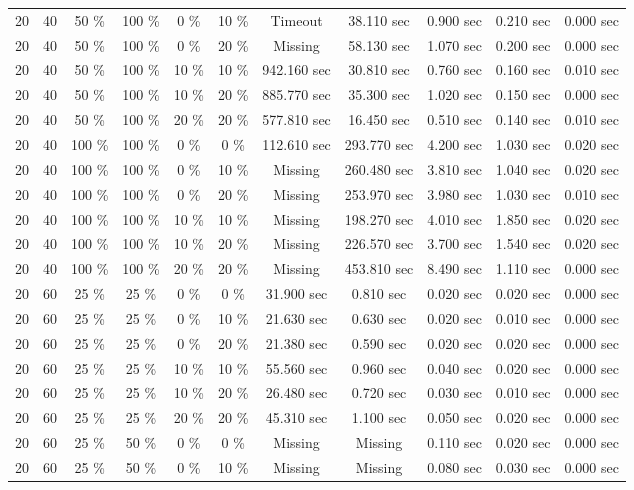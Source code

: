\documentclass{article}
\begin{document}
\begin{longtable}[]{@{}ccccccccccc@{}}
20 & 40 & 50 \% & 100 \% & 0 \% & 10 \% & Timeout & 38.110 sec & 0.900 sec & 0.210 sec & 0.000 sec \\
20 & 40 & 50 \% & 100 \% & 0 \% & 20 \% & Missing & 58.130 sec & 1.070 sec & 0.200 sec & 0.000 sec \\
20 & 40 & 50 \% & 100 \% & 10 \% & 10 \% & 942.160 sec & 30.810 sec & 0.760 sec & 0.160 sec & 0.010 sec \\
20 & 40 & 50 \% & 100 \% & 10 \% & 20 \% & 885.770 sec & 35.300 sec & 1.020 sec & 0.150 sec & 0.000 sec \\
20 & 40 & 50 \% & 100 \% & 20 \% & 20 \% & 577.810 sec & 16.450 sec & 0.510 sec & 0.140 sec & 0.010 sec \\
20 & 40 & 100 \% & 100 \% & 0 \% & 0 \% & 112.610 sec & 293.770 sec & 4.200 sec & 1.030 sec & 0.020 sec \\
20 & 40 & 100 \% & 100 \% & 0 \% & 10 \% & Missing & 260.480 sec & 3.810 sec & 1.040 sec & 0.020 sec \\
20 & 40 & 100 \% & 100 \% & 0 \% & 20 \% & Missing & 253.970 sec & 3.980 sec & 1.030 sec & 0.010 sec \\
20 & 40 & 100 \% & 100 \% & 10 \% & 10 \% & Missing & 198.270 sec & 4.010 sec & 1.850 sec & 0.020 sec \\
20 & 40 & 100 \% & 100 \% & 10 \% & 20 \% & Missing & 226.570 sec & 3.700 sec & 1.540 sec & 0.020 sec \\
20 & 40 & 100 \% & 100 \% & 20 \% & 20 \% & Missing & 453.810 sec & 8.490 sec & 1.110 sec & 0.000 sec \\
20 & 60 & 25 \% & 25 \% & 0 \% & 0 \% & 31.900 sec & 0.810 sec & 0.020 sec & 0.020 sec & 0.000 sec \\
20 & 60 & 25 \% & 25 \% & 0 \% & 10 \% & 21.630 sec & 0.630 sec & 0.020 sec & 0.010 sec & 0.000 sec \\
20 & 60 & 25 \% & 25 \% & 0 \% & 20 \% & 21.380 sec & 0.590 sec & 0.020 sec & 0.020 sec & 0.000 sec \\
20 & 60 & 25 \% & 25 \% & 10 \% & 10 \% & 55.560 sec & 0.960 sec & 0.040 sec & 0.020 sec & 0.000 sec \\
20 & 60 & 25 \% & 25 \% & 10 \% & 20 \% & 26.480 sec & 0.720 sec & 0.030 sec & 0.010 sec & 0.000 sec \\
20 & 60 & 25 \% & 25 \% & 20 \% & 20 \% & 45.310 sec & 1.100 sec & 0.050 sec & 0.020 sec & 0.000 sec \\
20 & 60 & 25 \% & 50 \% & 0 \% & 0 \% & Missing & Missing & 0.110 sec & 0.020 sec & 0.000 sec \\
20 & 60 & 25 \% & 50 \% & 0 \% & 10 \% & Missing & Missing & 0.080 sec & 0.030 sec & 0.000 sec \\

\end{longtable}
\end{document}
